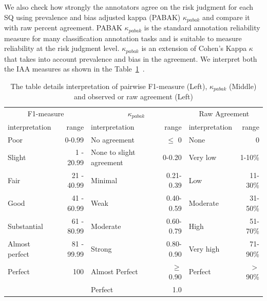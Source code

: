 \documentclass[sn-mathphys,Numbered]{sn-jnl}%
\theoremstyle{thmstyleone}%
\theoremstyle{thmstyletwo}%
\theoremstyle{thmstylethree}%
\begin{document}
We also check how strongly the annotators agree on the risk judgment for each SQ using prevalence and bias adjusted kappa (PABAK) $\kappa_{pabak}$ and compare it with raw percent agreement.
PABAK $\kappa_{pabak}$ is the standard annotation reliability measure for many classification annotation tasks and is suitable to measure reliability at the risk judgment level.
$\kappa_{pabak}$ is an extension of Cohen's Kappa $\kappa$ that takes into account prevalence and bias in the agreement.
We interpret both the IAA measures as shown in the Table~\ref{tab:iaa_interpret}~\cite{mchugh2012interrater,cohen1960coefficient,byrt1993bias,landis1977measurement}.
%
%
%
\begin{center}
 \begin{table}[htb]
   \caption{The table details interpretation of pairwise F1-measure (Left), $\kappa_{pabak}$ (Middle) and observed or raw agreement (Left)}\label{tab:iaa_interpret}
 \centering
    \begin{tabular}{lr|lr|lr}
    \toprule[1.0pt]
    \multicolumn{2}{c|}{F1-measure} & \multicolumn{2}{c|}{$\kappa_{pabak}$}& \multicolumn{2}{c}{Raw Agreement}  \\ 
    interpretation & range & interpretation & range & interpretation & range \\ 
    \midrule[1.0pt]
        Poor & 0-0.99 &  No agreement& $\leq$ 0 & None & 0 \\ 
        Slight & 1 - 20.99 &  None to slight agreement & 0-0.20 & Very low & 1-10\% \\ 
        Fair & 21 - 40.99 &  Minimal & 0.21-0.39 & Low & 11-30\% \\ 
        Good & 41 - 60.99 & Weak & 0.40-0.59 & Moderate & 31-50\% \\ 
        Substantial & 61 - 80.99 & Moderate & 0.60-0.79 & High & 51-70\% \\ 
        Almost perfect & 81 - 99.99 & Strong & 0.80-0.90 & Very high & 71-90\% \\ 
        Perfect & 100 & Almost Perfect & $\geq$ 0.90 & Perfect & $>$90\% \\ 
         & & Perfect & 1.0 \\ 
    \bottomrule[1.0pt]
    \end{tabular}
 \end{table}   
\end{center}
%
%
%
\end{document}
